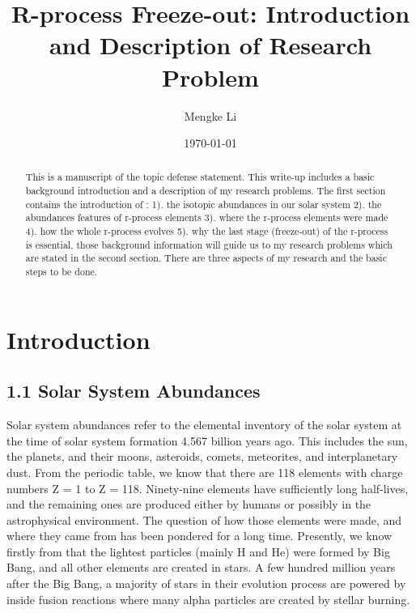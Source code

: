 \documentclass[aps,prl,preprint,groupedaddress]{revtex4}
\begin{document}
\title{R-process Freeze-out: Introduction and Description of Research Problem}

\author{Mengke Li}

\date{\today}

\begin{abstract}
This is a manuscript of the topic defense statement. This write-up includes a basic background introduction and a description of my research problems. The first section contains the introduction of : 1). the isotopic abundances in our solar system 2). the abundances features of r-process elements 3). where the r-process elements were made 4). how the whole r-process evolves 5). why the last stage (freeze-out) of the r-process is essential, those background information will guide us to my research problems which are stated in the second section. There are three aspects of my research and the basic steps to be done.

\end{abstract}
\maketitle
\section{Introduction}
\label{sec:intro}
\subsection{1.1 Solar System Abundances}
Solar system abundances refer to the elemental inventory of the solar system at the time of solar system formation 4.567 billion years ago. This includes the sun, the planets, and their moons, asteroids, comets, meteorites, and interplanetary dust\cite{Lodders2020SolarEA}. From the periodic table, we know that there are 118 elements with charge numbers Z = 1 to Z = 118. Ninety-nine elements have sufficiently long half-lives, and the remaining ones are produced either by humans or possibly in the astrophysical environment. The question of how those elements were made, and where they came from has been pondered for a long time. Presently, we know firstly from \cite{1957RvMP...29..547B} that the lightest particles (mainly \rm{H} and \rm{He}) were formed by Big Bang, and all other elements are created in stars. A few hundred million years after the Big Bang, a majority of stars in their evolution process are powered by inside fusion reactions where many alpha particles are created by stellar burning.\\ 
\end{document}
